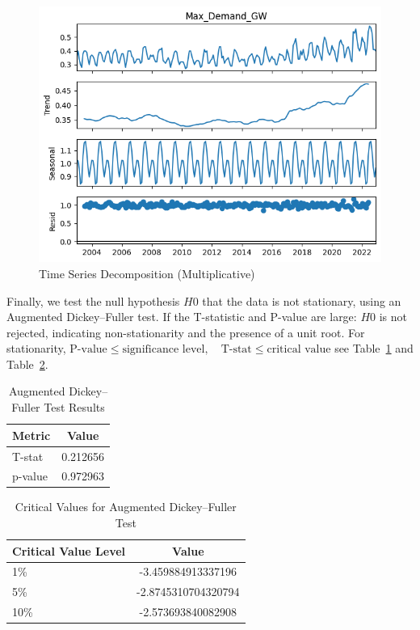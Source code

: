 \documentclass{ieeeaccess}
\begin{document}
\begin{figure}[htb]
    \centering
    \includegraphics[width=\columnwidth]{data_analysis/acf3.png}
    \caption{Time Series Decomposition (Multiplicative)}
    \label{fig:acf3}
\end{figure}

Finally, we test the null hypothesis \(H0\) that the data is not stationary, using an Augmented Dickey–Fuller test. If the T-statistic and P-value are large: \(H0\) is not rejected, indicating non-stationarity and the presence of a unit root. For stationarity, $\text{P-value} \leq \text{significance level}, \quad \text{T-stat} \leq \text{critical value}$ see Table~\ref{adfTable} and Table~\ref{adfTableCrit}.

\begin{table}[h!]

\centering
\caption{Augmented Dickey–Fuller Test Results}
\begin{tabular}{|l|c|}
\hline
\textbf{Metric} & \textbf{Value} \\
\hline
T-stat & 0.212656 \\
p-value & 0.972963 \\
\hline
\end{tabular}

\label{adfTable}
\end{table}

\begin{table}[h!]

\centering
\caption{Critical Values for Augmented Dickey–Fuller Test}
\begin{tabular}{|l|c|}
\hline
\textbf{Critical Value Level} & \textbf{Value} \\
\hline
1\% & -3.459884913337196 \\
5\% & -2.8745310704320794 \\
10\% & -2.573693840082908 \\
\hline
\end{tabular}

\label{adfTableCrit}
\end{table}
\end{document}
